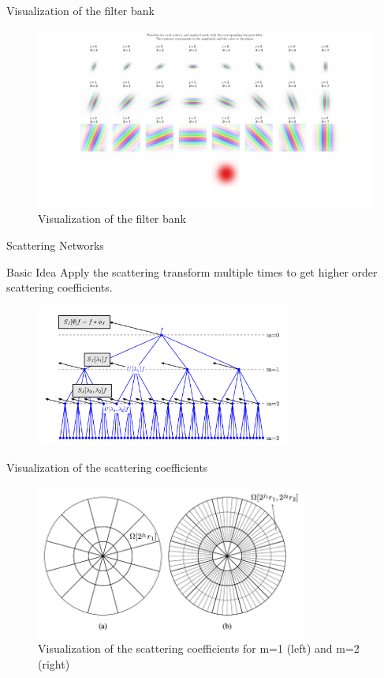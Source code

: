 \documentclass[compress]{beamer}
\begin{document}
	\begin{frame}{Visualization of the filter bank}
		\begin{figure}[!htb]
			\centering
			\includegraphics[width=\textwidth]{images/filter_bank_vis.png}
			\caption{Visualization of the filter bank}
			\label{fig:viz_filter_bank}
		\end{figure}
	\end{frame}
	\begin{frame}{Scattering Networks}
		\begin{block}{Basic Idea}
			Apply the scattering transform multiple times to get higher order scattering coefficients.
		\end{block}
		\begin{figure}[!htb]
			\centering
			\includegraphics[width = 0.75\textwidth]{images/scattering_network.png}
			\caption{}
			\label{fig:scattering_network}
		\end{figure}
	\end{frame}
	\begin{frame}{Visualization of the scattering coefficients}
		\begin{figure}[!htb]
			\includegraphics[width=0.8\textwidth]{images/viz_scattering_coeff_m12.png}
			\caption{Visualization of the scattering coefficients for m=1 (left) and m=2 (right)}
		\end{figure}
	\end{frame}
\end{document}
